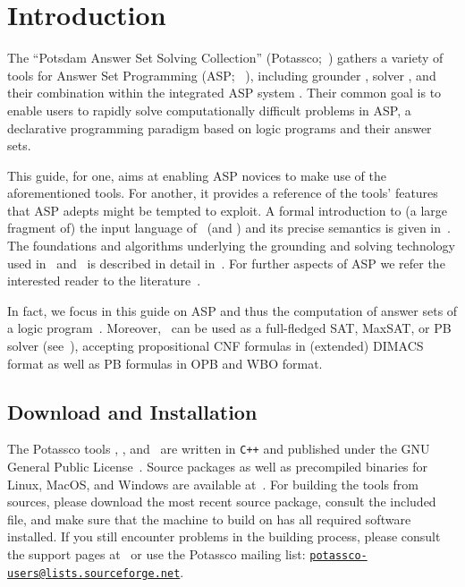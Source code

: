 \section{Introduction}\label{sec:introduction}

The ``Potsdam Answer Set Solving Collection'' (Potassco;~\cite{gekakaosscsc11a,gekakasc12a,potassco})
gathers a variety of tools for Answer Set Programming (ASP;~%
\cite{ankolisc05a,baral02a,breitr11a,gelfond08a,gelkah14a,gelleo02a,lifschitz02a,martru99a,niemela99a}),
including grounder \gringo, solver \clasp, and their combination within the integrated ASP system \clingo.
Their common goal is to enable users
to rapidly solve computationally difficult problems in ASP,
a declarative programming paradigm based on
logic programs and their answer sets.

This guide, for one, aims at enabling ASP novices to make use of the aforementioned tools.
For another, it provides a reference of the tools' features that ASP adepts might be tempted to exploit.
%
A formal introduction to (a large fragment of) the input language of \gringo\ (and \clingo) and its precise semantics is given in~\cite{gehakalisc14a}.
The foundations and algorithms underlying the grounding and solving technology used in \gringo\ and \clasp\ is described in detail in~\cite{gekakasc12a}.
%
For further aspects of ASP we refer the interested reader to the literature~\cite{baral02a,gelkah14a}.

In fact, 
we focus in this guide on ASP and thus the computation of answer sets of a logic program~\cite{gellif88b}.
Moreover, \clasp\ can be used as a full-fledged SAT, MaxSAT, or PB solver (see~\cite{SATHandbook}), 
accepting propositional CNF formulas in (extended) DIMACS format as well as PB formulas in OPB and WBO format.

\subsection{Download and Installation}\label{sec:install}

The Potassco tools \gringo, \clasp, and \clingo\
are written in \texttt{C++} and published under the GNU General Public License~\cite{GNUgpl}.
Source packages as well as precompiled binaries for Linux, MacOS, and Windows
are available at~\cite{potassco}.
For building the tools from sources,
please download the most recent source package,
consult the included  file,
and make sure that the machine to build on has all required software installed.
If you still encounter problems in the building process,
please consult the support pages at~\cite{potassco}
or use the Potassco mailing list:
\href{mailto:potassco-users@lists.sourceforge.net}{\texttt{potassco-users@lists.sourceforge.net}}.

